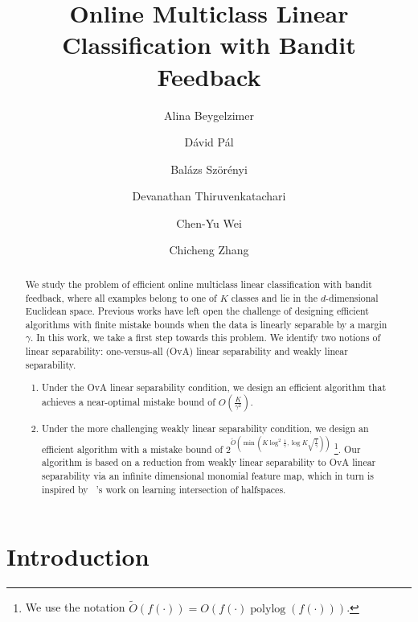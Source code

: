 \documentclass[12pt]{article}
\title{Online Multiclass Linear Classification with Bandit Feedback}
\author{
Alina Beygelzimer \and
D\'avid P\'al \and
Bal\'azs Sz\"or\'enyi \and
Devanathan Thiruvenkatachari \and
Chen-Yu Wei \and
Chicheng Zhang
}
\DeclareMathOperator*{\polylog}{polylog}
\begin{document}
\maketitle

\begin{abstract}
We study the problem of efficient online multiclass linear classification with bandit feedback, where all examples belong to one of $K$ classes and lie in the $d$-dimensional Euclidean space.
Previous works have left open the challenge of designing efficient algorithms with finite mistake bounds
when the data is linearly separable by a margin $\gamma$.
In this work, we take a first step towards this problem.
We identify two notions of linear separability:
one-versus-all (OvA) linear separability and weakly linear separability.
\begin{enumerate}
\item Under the OvA
linear separability condition, we design an efficient algorithm that achieves a near-optimal mistake bound of $O(\frac{K}{\gamma^2})$.
\item Under the more challenging weakly linear separability condition, we design an efficient algorithm with a mistake bound of $2^{\tilde{O}(\min(K \log^2 \frac 1 \gamma, \log K \sqrt{\frac 1 \gamma})) }$ \footnote{We use the notation $\tilde{O}(f(\cdot)) = O( f(\cdot) \polylog(f(\cdot)) )$.}.
Our algorithm is based on a reduction from weakly linear separability to OvA linear separability via an infinite dimensional monomial feature map, which in turn is inspired by ~\cite{Klivans-Servedio-2008}'s work on learning intersection of halfspaces.
\end{enumerate}



\end{abstract}

\section{Introduction}
\label{section:introduction}
\end{document}
